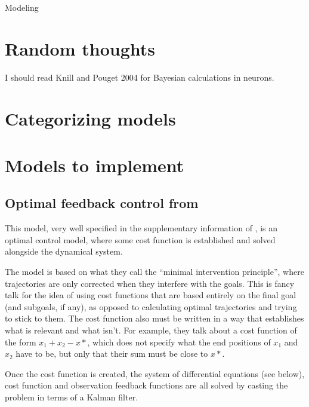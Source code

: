 \documentclass{report}
\begin{document}

\begin{chapter}{Modeling}
\section{Random thoughts}
I should read Knill and Pouget 2004 for Bayesian calculations in neurons.

\section{Categorizing models}

\section{Models to implement}
\subsection{Optimal feedback control from \cite{Todorov_Optimal_2002}}
\label{subsec:todorov-2002}
This model, very well specified in the supplementary information of
\cite{Todorov_Optimal_2002}, is an optimal control model, where some cost
function is established and solved alongside the dynamical system.

The model is based on what they call the ``minimal intervention principle'',
where trajectories are only corrected when they interfere with the goals. This
is fancy talk for the idea of using cost functions that are based entirely on
the final goal (and subgoals, if any), as opposed to calculating optimal
trajectories and trying to stick to them. The cost function also must be written
in a way that establishes what is relevant and what isn't. For example, they
talk about a cost function of the form $x_1 + x_2 - x*$, which does not specify
what the end positions of $x_1$ and $x_2$ have to be, but only that their sum
must be close to $x*$.

Once the cost function is created, the system of differential equations (see
below), cost function and observation feedback functions are all solved by
casting the problem in terms of a Kalman filter.


\end{chapter}
\end{document}
